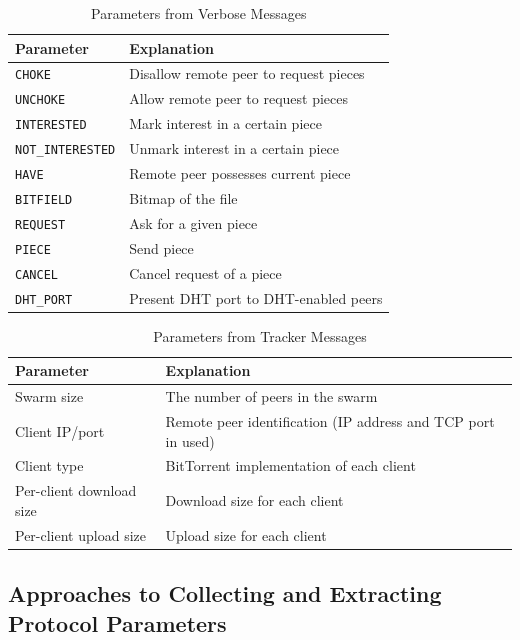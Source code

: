 \begin{table}[htb]
  \centering
  \caption{Parameters from Verbose Messages}
  \label{tab:proto-measure:verbose-messages-params}
  \begin{tabular}{@{}ll@{}}
    \toprule
      \textbf{Parameter} & \textbf{Explanation} \\
    \midrule
      \texttt{CHOKE} & Disallow remote peer to request pieces \\
      \texttt{UNCHOKE} & Allow remote peer to request pieces \\
      \texttt{INTERESTED} & Mark interest in a certain piece \\
      \texttt{NOT\_INTERESTED} & Unmark interest in a certain piece \\
      \texttt{HAVE} & Remote peer possesses current piece \\
      \texttt{BITFIELD} & Bitmap of the file \\
      \texttt{REQUEST} & Ask for a given piece \\
      \texttt{PIECE} & Send piece \\
      \texttt{CANCEL} & Cancel request of a piece \\
      \texttt{DHT\_PORT} & Present DHT port to DHT-enabled peers \\
    \bottomrule
  \end{tabular}
\end{table}

\begin{table}[htb]
  \centering
  \caption{Parameters from Tracker Messages}
  \label{tab:proto-measure:tracker-messages-params}
  \begin{tabular}{@{}ll@{}}
    \toprule
      \textbf{Parameter} & \textbf{Explanation} \\
    \midrule
      Swarm size & The number of peers in the swarm \\
      Client IP/port & Remote peer identification (IP address and TCP port in
      used) \\
      Client type & BitTorrent implementation of each client \\
      Per-client download size & Download size for each client \\
      Per-client upload size & Upload size for each client \\
    \bottomrule
  \end{tabular}
\end{table}

\subsection{Approaches to Collecting and Extracting Protocol Parameters}

